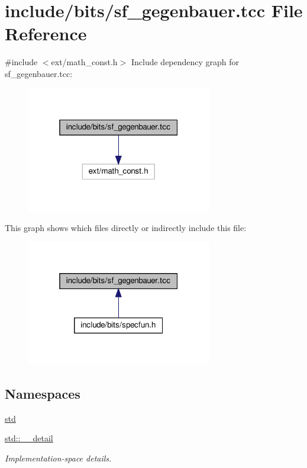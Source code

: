 \hypertarget{sf__gegenbauer_8tcc}{}\section{include/bits/sf\+\_\+gegenbauer.tcc File Reference}
\label{sf__gegenbauer_8tcc}
{\ttfamily \#include $<$ext/math\+\_\+const.\+h$>$}\newline
Include dependency graph for sf\+\_\+gegenbauer.\+tcc\+:
\nopagebreak
\begin{figure}[H]
\begin{center}
\leavevmode
\includegraphics[width=229pt]{sf__gegenbauer_8tcc__incl}
\end{center}
\end{figure}
This graph shows which files directly or indirectly include this file\+:
\nopagebreak
\begin{figure}[H]
\begin{center}
\leavevmode
\includegraphics[width=229pt]{sf__gegenbauer_8tcc__dep__incl}
\end{center}
\end{figure}
\subsection*{Namespaces}
\begin{DoxyCompactItemize}
\item 
 \hyperlink{namespacestd}{std}
\item 
 \hyperlink{namespacestd_1_1____detail}{std\+::\+\_\+\+\_\+detail}
\begin{DoxyCompactList}\small\item\em Implementation-\/space details. \end{DoxyCompactList}\end{DoxyCompactItemize}
